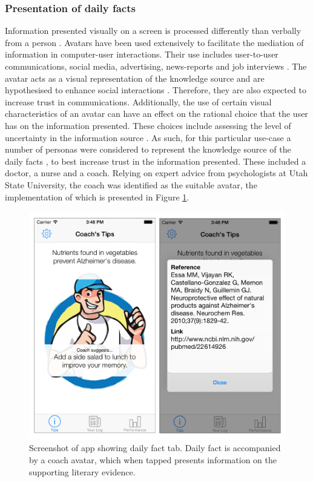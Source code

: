 \subsubsection{Presentation of daily facts}
Information presented visually on a screen is processed differently than verbally from a person \cite{Sundar2015}. Avatars have been used extensively to facilitate the mediation of information in computer-user interactions. Their use includes user-to-user communications, social media, advertising, news-reports and job interviews \cite{Sundar2015}. The avatar acts as a visual representation of the knowledge source \cite{Bente2008} and are hypothesised to enhance social interactions \cite{Blascovich2002}. Therefore, they are also expected to increase trust in communications. Additionally, the use of certain visual characteristics of an avatar can have an effect on the rational choice that the user has on the information presented. These choices include assessing the level of uncertainty in the information  source \cite{Afifi2000}. As such, for this particular use-case a number of personas were considered to represent the knowledge source of the daily facts \cite{Sundar2015}, to best increase trust in the information presented. These included a doctor, a nurse and a coach. Relying on expert advice from psychologists at Utah State University, the coach was identified as the suitable avatar, the implementation of which is presented in Figure \ref{fig: screenshot-dailyfact}.

\begin{figure}[h]
    \centering
    \includegraphics[scale=0.25, angle=0]{Files/prevention-study-1/figures/screenshot-dailyfact.png}
    \caption{Screenshot of app showing daily fact tab. Daily fact is accompanied by a coach avatar, which when tapped presents information on the supporting literary evidence.}
    \label{fig: screenshot-dailyfact}
\end{figure}


